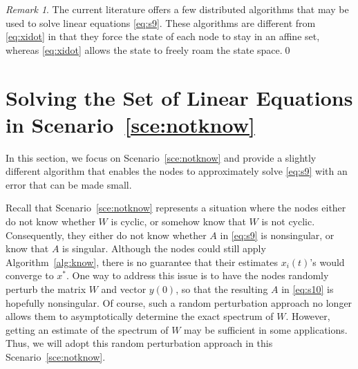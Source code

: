 \documentclass[11pt]{article}
\theoremstyle{plain}
\theoremstyle{definition}
\theoremstyle{remark}
\newtheorem{remark}{Remark}
\begin{document}
\begin{remark}\label{rem:lite}
The current literature offers a few distributed algorithms \cite{Nedic10, MouS13} that may be used to solve linear equations \eqref{eq:s9}. These algorithms are different from \eqref{eq:xidot} in that they force the state of each node to stay in an affine set, whereas \eqref{eq:xidot} allows the state to freely roam the state space.\qed
\end{remark}

\section{Solving the Set of Linear Equations in Scenario~\ref{sce:notknow}}\label{sec:solvlineequascennotknow}

In this section, we focus on Scenario~\ref{sce:notknow} and provide a slightly different algorithm that enables the nodes to approximately solve \eqref{eq:s9} with an error that can be made small.

Recall that Scenario~\ref{sce:notknow} represents a situation where the nodes either do not know whether $W$ is cyclic, or somehow know that $W$ is not cyclic. Consequently, they either do not know whether $A$ in \eqref{eq:s9} is nonsingular, or know that $A$ is singular. Although the nodes could still apply Algorithm~\ref{alg:know}, there is no guarantee that their estimates $x_i(t)$'s would converge to $x^*$. One way to address this issue is to have the nodes randomly perturb the matrix $W$ and vector $y(0)$, so that the resulting $A$ in \eqref{eq:s10} is hopefully nonsingular. Of course, such a random perturbation approach no longer allows them to asymptotically determine the exact spectrum of $W$. However, getting an estimate of the spectrum of $W$ may be sufficient in some applications. Thus, we will adopt this random perturbation approach in this Scenario~\ref{sce:notknow}.
\end{document}
